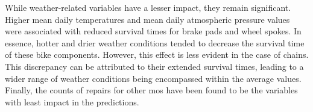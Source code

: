     While weather-related variables have a lesser impact, they remain significant. Higher mean daily temperatures and mean daily atmospheric pressure values were associated with reduced survival times for brake pads and wheel spokes. In essence, hotter and drier weather conditions tended to decrease the survival time of these bike components. However, this effect is less evident in the case of chains. This discrepancy can be attributed to their extended survival times, leading to a wider range of weather conditions being encompassed within the average values. Finally, the counts of repairs for other \acp{mo} have been found to be the variables with least impact in the predictions.
        